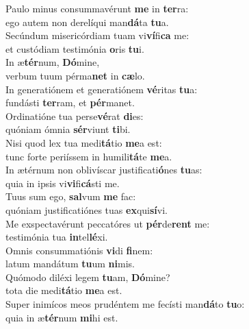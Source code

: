 \oddverse Paulo minus consummavérunt \textbf{me} in \textbf{ter}ra:~\*\\
\oddverse ego autem non derelíqui man\textbf{dá}ta \textbf{tu}a.\\
\evenverse Secúndum misericórdiam tuam vi\textbf{ví}fi\textbf{ca} me:~\*\\
\evenverse et custódiam testimónia \textbf{o}ris \textbf{tu}i.\\
\oddverse In æ\textbf{tér}num, \textbf{Dó}mine,~\*\\
\oddverse verbum tuum pérma\textbf{net} in \textbf{cæ}lo.\\
\evenverse In generatiónem et generatiónem \textbf{vé}ritas \textbf{tu}a:~\*\\
\evenverse fundásti \textbf{ter}ram, et \textbf{pér}manet.\\
\oddverse Ordinatióne tua perse\textbf{vé}rat \textbf{di}es:~\*\\
\oddverse quóniam ómnia \textbf{sér}viunt \textbf{ti}bi.\\
\evenverse Nisi quod lex tua medi\textbf{tá}tio \textbf{me}a est:~\*\\
\evenverse tunc forte periíssem in humili\textbf{tá}te \textbf{me}a.\\
\oddverse In ætérnum non oblivíscar justificati\textbf{ó}nes \textbf{tu}as:~\*\\
\oddverse quia in ipsis vi\textbf{vi}fi\textbf{cá}sti me.\\
\evenverse Tuus sum ego, \textbf{sal}vum \textbf{me} fac:~\*\\
\evenverse quóniam justificatiónes tuas \textbf{ex}qui\textbf{sí}vi.\\
\oddverse Me exspectavérunt peccatóres ut \textbf{pér}de\textbf{rent} me:~\*\\
\oddverse testimónia tua \textbf{in}tel\textbf{lé}xi.\\
\evenverse Omnis consummatiónis \textbf{vi}di \textbf{fi}nem:~\*\\
\evenverse latum mandátum \textbf{tu}um \textbf{ni}mis.\\
\oddverse Quómodo diléxi legem \textbf{tu}am, \textbf{Dó}mine?~\*\\
\oddverse tota die medi\textbf{tá}tio \textbf{me}a est.\\
\evenverse Super inimícos meos prudéntem me fecísti man\textbf{dá}to \textbf{tu}o:~\*\\
\evenverse quia in æ\textbf{tér}num \textbf{mi}hi est.\\
